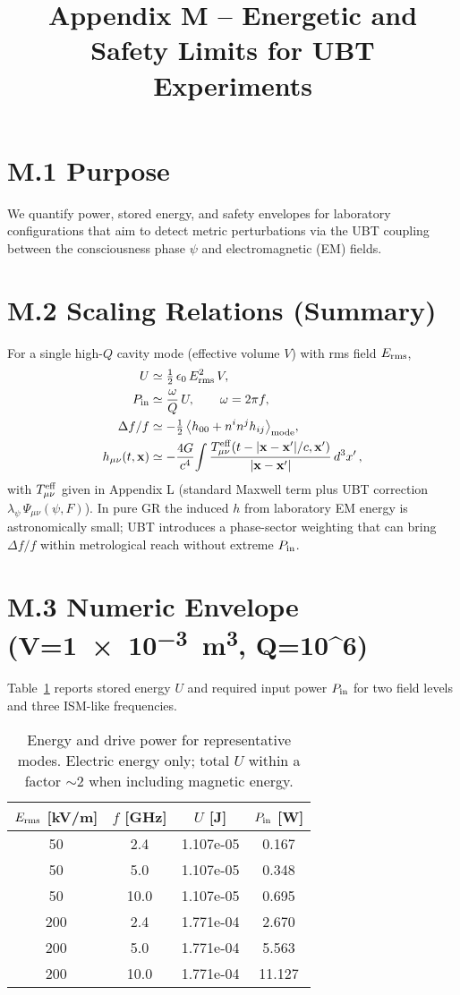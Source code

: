 \documentclass[12pt]{article}
\title{Appendix M -- Energetic and Safety Limits for UBT Experiments}
\date{}
\begin{document}
\maketitle

\section*{M.1 Purpose}
We quantify power, stored energy, and safety envelopes for laboratory configurations that aim to detect metric perturbations via the UBT coupling between the consciousness phase $\psi$ and electromagnetic (EM) fields.

\section*{M.2 Scaling Relations (Summary)}
For a single high-$Q$ cavity mode (effective volume $V$) with rms field $E_{\rm rms}$,
\begin{align}
U &\simeq \tfrac{1}{2}\,\epsilon_0\,E_{\rm rms}^2\,V,\\
P_{\rm in} &\simeq \frac{\omega}{Q}\,U, \qquad \omega=2\pi f,\\
\Delta f/f &\simeq -\tfrac{1}{2}\,\big\langle h_{00}+n^i n^j h_{ij}\big\rangle_{\rm mode},\\
h_{\mu\nu}(t,\mathbf{x}) &\simeq -\frac{4G}{c^4}\!\int \frac{T^{\rm eff}_{\mu\nu}(t-|\mathbf{x}-\mathbf{x}'|/c,\mathbf{x}')}{|\mathbf{x}-\mathbf{x}'|}\,d^3x'\,,
\end{align}
with $T^{\rm eff}_{\mu\nu}$ given in Appendix L (standard Maxwell term plus UBT correction $\lambda_\psi\,\Psi_{\mu\nu}(\psi,F)$). In pure GR the induced $h$ from laboratory EM energy is astronomically small; UBT introduces a phase-sector weighting that can bring $\Delta f/f$ within metrological reach without extreme $P_{\rm in}$.

\section*{M.3 Numeric Envelope (V=\SI{1e-3}{m^3}, Q=10^6)}
Table~\ref{tab:envelope} reports stored energy $U$ and required input power $P_{\rm in}$ for two field levels and three ISM-like frequencies.
\begin{table}[h!]
\centering
\begin{tabular}{|c|c|c|c|}
\hline
$E_{\rm rms}$ [kV/m] & $f$ [GHz] & $U$ [J] & $P_{\rm in}$ [W] \\\hline
50 & 2.4 & 1.107e-05 & 0.167 \\
50 & 5.0 & 1.107e-05 & 0.348 \\
50 & 10.0 & 1.107e-05 & 0.695 \\
200 & 2.4 & 1.771e-04 & 2.670 \\
200 & 5.0 & 1.771e-04 & 5.563 \\
200 & 10.0 & 1.771e-04 & 11.127 \\
%
\hline
\end{tabular}
\caption{Energy and drive power for representative modes. Electric energy only; total $U$ within a factor $\sim 2$ when including magnetic energy.}
\label{tab:envelope}
\end{table}
\end{document}
